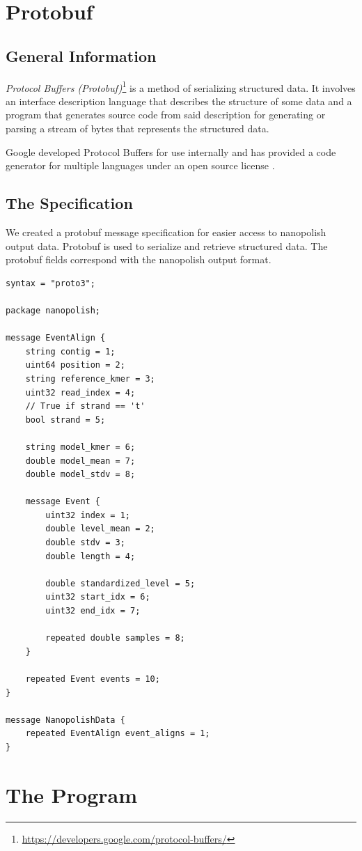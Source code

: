 \documentclass[times, utf, seminar]{fer}
\begin{document}
\chapter{Protobuf}
\section{General Information}
\textit{Protocol Buffers (Protobuf)}\footnote{\url{https://developers.google.com/protocol-buffers/}} is a method of serializing structured data. It involves an interface description language that describes the structure of some data and a program that generates source code from said description for generating or parsing a stream of bytes that represents the structured data.

Google developed Protocol Buffers for use internally and has provided a code generator for multiple languages under an open source license \citep{protobuf}.
\section{The Specification}
We created a protobuf message specification for easier access to nanopolish 
output data. Protobuf is used to serialize and retrieve structured data.
The protobuf fields correspond with the nanopolish output format. 

\begin{lstlisting}
syntax = "proto3";

package nanopolish;

message EventAlign {
	string contig = 1;
	uint64 position = 2;
	string reference_kmer = 3;
	uint32 read_index = 4;
	// True if strand == 't'
	bool strand = 5;

	string model_kmer = 6;
	double model_mean = 7;
	double model_stdv = 8;

	message Event {
		uint32 index = 1;
		double level_mean = 2;
		double stdv = 3;
		double length = 4;

		double standardized_level = 5;
		uint32 start_idx = 6;
		uint32 end_idx = 7;

		repeated double samples = 8;
	}

	repeated Event events = 10;
}

message NanopolishData {
	repeated EventAlign event_aligns = 1;
}
\end{lstlisting}


\chapter{The Program}
\end{document}
